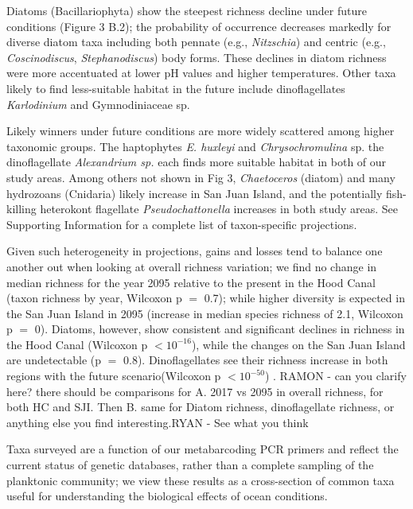 \documentclass[11pt]{article}
\begin{document}
\begin{linenumbers}
Diatoms (Bacillariophyta) show the steepest richness decline under future conditions (Figure 3 B.2); the probability of occurrence decreases markedly for diverse diatom taxa including both pennate (e.g., \textit{Nitzschia}) and centric (e.g., \textit{Coscinodiscus}, \textit{Stephanodiscus}) body forms. These declines in diatom richness were more accentuated at lower pH values and higher temperatures. Other taxa likely to find less-suitable habitat in the future include dinoflagellates \textit{Karlodinium} and Gymnodiniaceae sp.

Likely winners under future conditions are more widely scattered among higher taxonomic groups. The haptophytes \textit{E. huxleyi} and \textit{Chrysochromulina} sp. the dinoflagellate \textit{Alexandrium sp.} each finds more suitable habitat in both of our study areas. Among others not shown in Fig 3, \textit{Chaetoceros} (diatom) and many hydrozoans (Cnidaria) likely increase in San Juan Island, and the potentially fish-killing heterokont flagellate \textit{Pseudochattonella} increases in both study areas. See Supporting Information for a complete list of taxon-specific projections.
 
Given such heterogeneity in projections, gains and losses tend to balance one another out when looking at overall richness variation; {\color{red} we find no change in median richness for the year 2095 relative to the present in the Hood Canal (taxon richness by year, Wilcoxon p $=$ 0.7); while higher diversity is expected in the San Juan Island in 2095 (increase in median species richness of 2.1, Wilcoxon p $=$ 0). Diatoms, however, show consistent and significant declines in richness in the Hood Canal (Wilcoxon p $< 10^{-16}$), while the changes on the San Juan Island are undetectable (p $=$ 0.8).  Dinoflagellates see their richness increase in both regions with the future scenario(Wilcoxon p $< 10^{-50}$) }.{\color{blue} RAMON - can you clarify here? there should be comparisons for A. 2017 vs 2095 in overall richness, for both HC and SJI.  Then B. same for Diatom richness, dinoflagellate richness, or anything else you find interesting.RYAN - See what you think}


Taxa surveyed are a function of our metabarcoding PCR primers \cite{leray_new_2013} and reflect the current status of genetic databases, rather than a complete sampling of the planktonic community; we view these results as a cross-section of common taxa useful for understanding the biological effects of ocean conditions.
 


\end{linenumbers}
\end{document}

